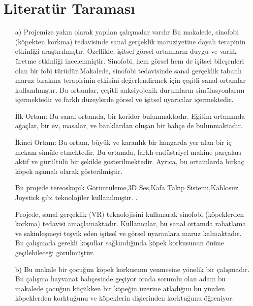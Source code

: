 \documentclass[12pt,a4paper]{article}
\begin{document}
		
		\section{Literatür Taraması}
		\begin{enumerate}
			\item[a)] Projemize yakın olarak yapılan çalışmalar vardır 
			Bu makalede, sinofobi (köpekten korkma) tedavisinde sanal gerçeklik maruziyetine dayalı terapinin etkinliği araştırılmıştır. Özellikle, işitsel-görsel ortamların duygu ve varlık üretme etkinliği incelenmiştir.
			Sinofobi, hem görsel hem de işitsel bileşenleri olan bir fobi türüdür.Makalede, sinofobi tedavisinde sanal gerçeklik tabanlı maruz bırakma terapisinin etkisini değerlendirmek için çeşitli sanal ortamlar kullanılmıştır. Bu ortamlar, çeşitli anksiyojenik durumların simülasyonlarını içermektedir ve farklı düzeylerde görsel ve işitsel uyarıcılar içermektedir.\newline
			
			İlk Ortam: Bu sanal ortamda, bir koridor bulunmaktadır. Eğitim ortamında ağaçlar, bir ev, masalar, ve banklardan oluşan bir bahçe de bulunmaktadır.\newline
			
			İkinci Ortam: Bu ortam, büyük ve karanlık bir hangarda yer alan bir iç mekanı simüle etmektedir. Bu ortamda, farklı endüstriyel makine parçaları aktif ve gürültülü bir şekilde gösterilmektedir. Ayrıca, bu ortamlarda birkaç köpek aşamalı olarak gösterilmiştir.\newline
	
	
			 Bu projede tereoskopik Görüntüleme,3D Ses,Kafa Takip Sistemi,Kablosuz Joystick gibi teknolojiler kullanılmıştır.
			\setcounter{page}{1}.
			
			
			Projede, sanal gerçeklik (VR) teknolojisini kullanarak sinofobi (köpeklerden korkma) tedavisi amaçlamaktadır. Kullanıcılar, bu sanal ortamda rahatlama ve sakinleşmeyi teşvik eden işitsel ve görsel uyaranlara maruz kalmaktadır. \newline
			Bu çalışmada gerekli koşullar sağlandığında köpek korkusunun önüne geçilebileceği görülmüştür\cite{MarinaTaffou}.\newline
		
			\item[b)]  
			Bu makale bir çocuğun köpek korkusunu yenmesine yönelik bir çalışmadır.
			Bu çalışma hayvanat bahçesinde geçiyor orada sorumlu olan adam bu makalede çocuğun küçükken bir köpeğin üzerine atladığını  bu yüzden köpeklerden korktuğunu ve köpeklerin dişlerinden korktuğunu  öğreniyor.
			

\end{enumerate}
\end{document}
